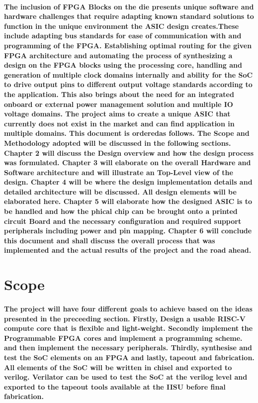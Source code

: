 \documentclass[12pt,a4paper]{report}
\begin{document}
\paragraph{\textrm{\textmd{The inclusion of FPGA Blocks on the die presents unique software and hardware challenges that require adapting known standard solutions to function in the unique environment the ASIC design creates.These include adapting bus standards for ease of communication with and programming of the FPGA. Establishing optimal routing for the given FPGA architecture and automating the process of synthesizing a design on the FPGA blocks using the processing core, handling and generation of multiple clock domains internally and ability for the SoC to drive output pins  to different output voltage standards according to the application. This also brings about the need for an integrated onboard or external power management solution and multiple IO voltage domains. The project aims to create a unique ASIC that currently does not exist in the market and can find application in multiple domains. This document is orderedas follows. The Scope and Methodology adopted will be discussed in the following sections. Chapter 2 will discuss the Design overview and how the design process was formulated. Chapter 3 will elaborate on the overall Hardware and Software architecture and will illustrate an  Top-Level view of the design. Chapter 4 will be where the design implementation details and detailed architecture will be discussed. All design elements will be elaborated here. Chapter 5 will elaborate how the designed ASIC is to be handled and how the phical chip can be brought onto a printed circuit Board and the necessary configuration and required support peripherals including power and pin mapping. Chapter 6 will conclude this document and shall discuss the overall process that was implemented and the actual results of the project and the road ahead.}}}


\section{Scope}
\paragraph{\textrm{\textmd{The project will have four different goals to achieve based on the ideas presented in the preceeding section. Firstly, Design a usable RISC-V compute core that is flexible and light-weight. Secondly implement the Programmable FPGA cores and implement a programming scheme. and then implement the necessary peripherals. Thirdly, synthesise and test the SoC elements on an FPGA and lastly, tapeout and fabrication. All elements of the SoC will be written in chisel and exported to verilog. Verilator can be used to test the SoC at the verilog level and exported to the tapeout tools available at the IISU before final fabrication.}}}
\end{document}
